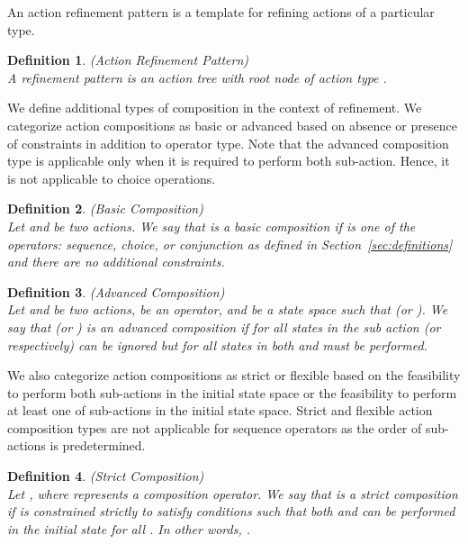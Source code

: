 \documentclass[12pt,journal,letterpaper,onecolumn]{IEEEtran}
\newtheorem{definition}{Definition}[section]
\begin{document}
An action refinement pattern is a template for refining actions of a
particular type.

\begin{definition}(Action Refinement Pattern)\\
A refinement pattern  is an action tree with root
node of action type .
\end{definition}

We define additional types of composition in the context of
refinement. We categorize action compositions as basic or
advanced based on absence or presence of constraints in addition to
operator type. Note that the advanced composition type is applicable
only when it is required to perform both sub-action. Hence, it is
not applicable to choice operations.

\begin{definition}(Basic Composition)\\
\label{def:basic} Let  and  be two actions. We say that
 is a basic composition if  is
one of the
 operators: sequence, choice, or conjunction as defined in
Section~\ref{sec:definitions} and there are no additional
constraints.
\end{definition}


\begin{definition}(Advanced Composition)\\
\label{def:advanced}  Let  and  be two actions, 
be an operator, and  be a state space such that  (or ). We say
that  (or ) is an advanced composition if for all
states in  the sub action  (or  respectively) can
be ignored but for all states in  both  and
 must be performed.
\end{definition}

We also categorize action compositions as strict or flexible
based on the feasibility to perform both sub-actions in the initial
state space or the feasibility to perform at least one of
sub-actions in the initial state space. Strict and flexible action
composition types are not applicable for sequence operators as the
order of sub-actions is predetermined.

\begin{definition}(Strict Composition)\\
\label{def:strict} Let , where
 represents a composition operator. We say that  is a strict composition if  is constrained
strictly to satisfy conditions such that {\em both}  and 
can be performed in the initial state for all .
In other words, .
\end{definition}
\end{document}
